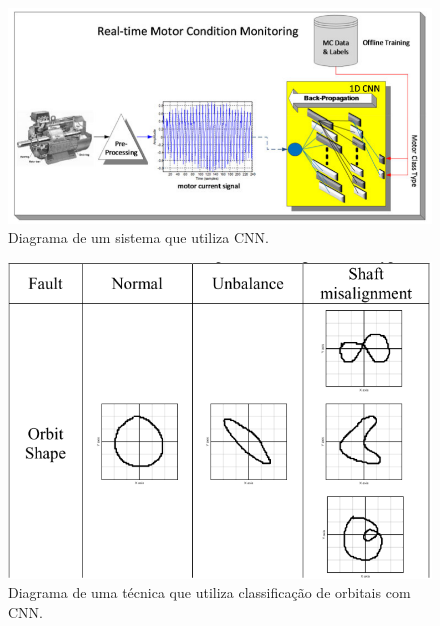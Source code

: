 \begin{figure}[H]
    \caption{Diagrama de um sistema que utiliza CNN.}
    \begin{center}
        \includegraphics[scale=.45]{referencial/img/cnn_ince_p2.png}
    \end{center}
    \label{fig:cnn_ince_p2}
\end{figure}


\begin{figure}[H]
    \caption{Diagrama de uma técnica que utiliza classificação de orbitais com CNN.}
    \begin{center}
        \includegraphics[scale=.45]{referencial/img/orbit_jeong_p3.png}
    \end{center}
    \label{fig:orbit_jeong_p3}
\end{figure}

